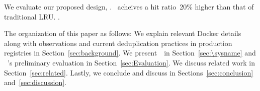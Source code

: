 
We evaluate our proposed design, \sysname. 
\sysname~acheives a hit ratio~20\% higher than that of traditional LRU. 
.  




The organization of this paper as follows: 
We explain relevant Docker details along with observations and current deduplication practices in production registries in Section~\ref{sec:background}.
We present~\sysname~in Section~\ref{sec:\sysname} and ~\sysname's preliminary evaluation in Section~\ref{sec:Evaluation}. 
We discuss related work in Section~\ref{sec:related}.
Lastly, we conclude and discuss in Sections~\ref{sec:conclusion} and~\ref{sec:discussion}.


